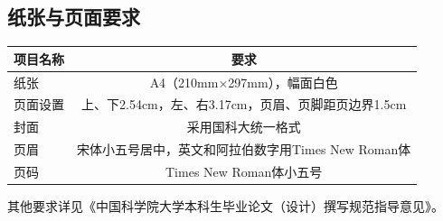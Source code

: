 {\subsection{纸张与页面要求}
\begin{table}[h]
    \centering
    \begin{tabular}{lc}
        \hline
        项目名称 & 要求\\
        \hline
        纸张&A4（210mm×297mm），幅面白色\\
        页面设置&上、下2.54cm，左、右3.17cm，页眉、页脚距页边界1.5cm\\
        封面&采用国科大统一格式\\
        页眉&宋体小五号居中，英文和阿拉伯数字用Times New Roman体\\
        页码&Times New Roman体小五号 \\

        \hline
    \end{tabular}

    \label{tab:printrequirements}
\end{table}

其他要求详见《中国科学院大学本科生毕业论文（设计）撰写规范指导意见》。}